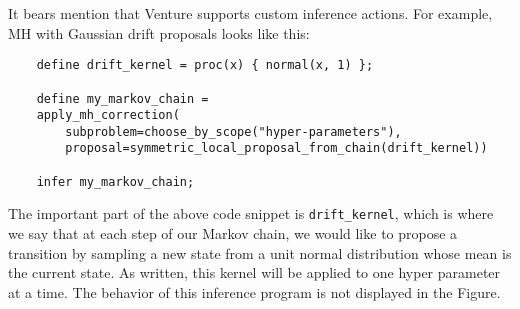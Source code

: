 It bears mention that Venture supports custom inference actions.
For example, \ac{MH} with Gaussian drift proposals looks like this:
    \begin{lstlisting}
    define drift_kernel = proc(x) { normal(x, 1) };

    define my_markov_chain =
	apply_mh_correction(
	    subproblem=choose_by_scope("hyper-parameters"),
	    proposal=symmetric_local_proposal_from_chain(drift_kernel))

    infer my_markov_chain;
    \end{lstlisting}
The important part of the above code snippet is \texttt{drift\_kernel}, which is where we say 
that at each step of our Markov chain, we would like to propose a transition by sampling
a new state from a unit normal distribution whose mean is the current state.
As written, this kernel will be applied to one hyper parameter at a time.
The behavior of this inference program is not displayed in the Figure.
